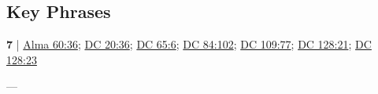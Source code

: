 \subsection{Key Phrases} %
	\label{HONOR-PHRASES}

	\begin{compactdesc}
		\item[honor, power, glory] \textbf{7} | \hyperref[ALMA-60-36]{Alma 60:36}; \hyperref[DC20-36]{DC 20:36}; \hyperref[DC65-6]{DC 65:6}; \hyperref[DC84-102]{DC 84:102}; \hyperref[DC109-77]{DC 109:77}; \hyperref[DC128-21]{DC 128:21}; \hyperref[DC128-23]{DC 128:23}
			\begin{compactdesc}
				\item[Bible anchor verses] ---
			\end{compactdesc}
	\end{compactdesc}
	


	
		
	
